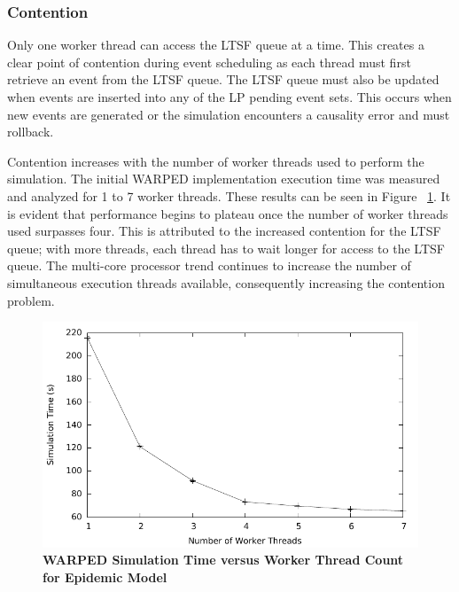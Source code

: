 \documentclass[a4paper]{article}
\begin{document}
\subsubsection{\textbf{Contention}}

Only one worker thread can access the LTSF queue at a time.  This creates a
clear point of contention during event scheduling as each thread must first
retrieve an event from the LTSF queue.  The LTSF queue must also be updated when
events are inserted into any of the LP pending event sets.  This occurs when new
events are generated or the simulation encounters a causality error and must
rollback.
\par

Contention increases with the number of worker threads used to perform the
simulation.  The initial WARPED implementation execution time was measured and
analyzed for 1 to 7 worker threads.  These results can be seen in Figure
~\ref{fig:notsx_profile}.  It is evident that performance begins to plateau once
the number of worker threads used surpasses four.  This is attributed to the
increased contention for the LTSF queue; with more threads, each thread has to
wait longer for access to the LTSF queue.  The multi-core processor trend
continues to increase the number of simultaneous execution threads available,
consequently increasing the contention problem.
\par

\begin{figure}[H]
    \centering
    \graphicspath{ {./figures/} }
    \includegraphics[width=\textwidth,height=\textheight,keepaspectratio]{notsx_profile}
    \caption{\textbf{WARPED Simulation Time versus Worker Thread Count for
    Epidemic Model}}
    \label{fig:notsx_profile}
\end{figure}
\end{document}

